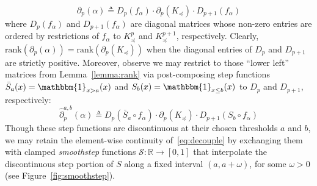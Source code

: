\documentclass[10pt]{article}
\numberwithin{equation}{section}
\newcommand{\+}{%
	\raisebox{0.18ex}{\scaleobj{0.55}{+}}
}
\theoremstyle{definition}
\theoremstyle{definition}
\begin{document}
	\begin{equation}\label{eq:decouple}
		\partial_p(\alpha) \triangleq D_p(f_\alpha) \cdot \partial_p(K_\preceq) \cdot D_{p+1}(f_\alpha) 
	\end{equation}
	where $D_p(f_\alpha)$ and  $D_{p+1}(f_\alpha)$ are diagonal matrices whose non-zero entries are ordered by restrictions of $f_\alpha$ to $K_\preceq^p$ and $K_\preceq^{p+1}$, respectively.
Clearly, $\mathrm{rank}(\partial_p(\alpha)) = \mathrm{rank}(\partial_p(K_\preceq))$ when the diagonal entries of $D_p$ and $D_{p+1}$ are strictly positive. Moreover, observe we may restrict to those ``lower left'' matrices from Lemma~\ref{lemma:rank} via post-composing step functions $\bar{S}_a(x) = \mathbbm{1}_{x > a}(x)$ and $S_b(x) = \mathbbm{1}_{x \leq b}(x)$ to $D_p$ and $D_{p+1}$, respectively:
\begin{equation}\label{eq:rank_equiv_param}
	 \hat{\partial}_p^{a,b}(\alpha) \triangleq D_p(\bar{S}_a \circ f_\alpha) \cdot \partial_p(K_\preceq) \cdot D_{p+1}(S_b \circ f_\alpha) 
	\end{equation}
Though these step functions are discontinuous at their chosen thresholds $a$ and $b$, we may retain the element-wise continuity of~\eqref{eq:decouple} by exchanging them with clamped \emph{smoothstep} functions $\mathcal{S}: \mathbb{R} \to [0, 1]$ that interpolate the discontinuous step portion of $S$ along a fixed interval $(a,a+\omega)$, for some $\omega > 0$ (see Figure~\ref{fig:smoothstep}).
\end{document}
